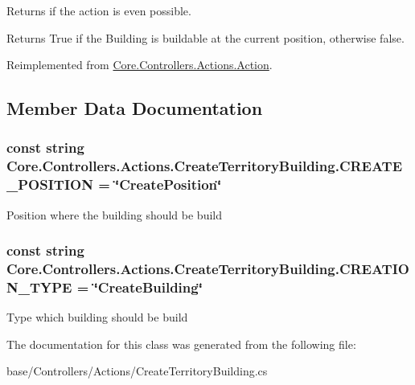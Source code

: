 Returns if the action is even possible. 

\begin{DoxyReturn}{Returns}
True if the Building is buildable at the current position, otherwise false.
\end{DoxyReturn}


Reimplemented from \hyperlink{classCore_1_1Controllers_1_1Actions_1_1Action_a405b995343a9394ad19e05a699a4e6d9}{Core.\+Controllers.\+Actions.\+Action}.



\subsection{Member Data Documentation}
\hypertarget{classCore_1_1Controllers_1_1Actions_1_1CreateTerritoryBuilding_a21edf4223bd88ef2e744e15545ba001e}{}
\subsubsection[{C\+R\+E\+A\+T\+E\+\_\+\+P\+O\+S\+I\+T\+I\+O\+N}]{\setlength{\rightskip}{0pt plus 5cm}const string Core.\+Controllers.\+Actions.\+Create\+Territory\+Building.\+C\+R\+E\+A\+T\+E\+\_\+\+P\+O\+S\+I\+T\+I\+O\+N = \char`\"{}Create\+Position\char`\"{}}\label{classCore_1_1Controllers_1_1Actions_1_1CreateTerritoryBuilding_a21edf4223bd88ef2e744e15545ba001e}


Position where the building should be build 

\hypertarget{classCore_1_1Controllers_1_1Actions_1_1CreateTerritoryBuilding_a87dd484286167126877650654512b160}{}
\subsubsection[{C\+R\+E\+A\+T\+I\+O\+N\+\_\+\+T\+Y\+P\+E}]{\setlength{\rightskip}{0pt plus 5cm}const string Core.\+Controllers.\+Actions.\+Create\+Territory\+Building.\+C\+R\+E\+A\+T\+I\+O\+N\+\_\+\+T\+Y\+P\+E = \char`\"{}Create\+Building\char`\"{}}\label{classCore_1_1Controllers_1_1Actions_1_1CreateTerritoryBuilding_a87dd484286167126877650654512b160}


Type which building should be build 



The documentation for this class was generated from the following file\+:\begin{DoxyCompactItemize}
\item 
base/\+Controllers/\+Actions/Create\+Territory\+Building.\+cs\end{DoxyCompactItemize}
